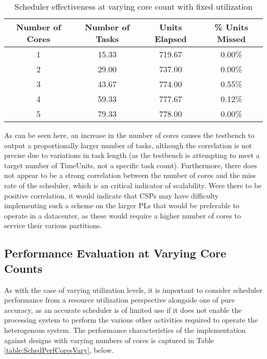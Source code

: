 \begin{table}[ht!]
    \centering\begin{tabular}{| c | c | c | c |}
        \hline
        Number of Cores & Number of Tasks & Units Elapsed & \% Units Missed \\
        \hline
        1 & 15.33 & 719.67 & 0.00\% \\
        2 & 29.00 & 737.00 & 0.00\% \\
        3 & 43.67 & 774.00 & 0.55\% \\
        4 & 59.33 & 777.67 & 0.12\% \\
        5 & 79.33 & 778.00 & 0.00\% \\
        \hline
    \end{tabular}
    \caption{Scheduler effectiveness at varying core count with fixed utilization}
    \label{table:SchedEffectivenessCoresVary}
\end{table}

As can be seen here, an increase in the number of cores causes the testbench to output a proportionally larger number of tasks, although the correlation is not precise due to variations in task length (as the testbench is attempting to meet a target number of TimeUnits, not a specific task count). Furthermore, there does not appear to be a strong correlation between the number of cores and the miss rate of the scheduler, which is an critical indicator of scalability. Were there to be positive correlation, it would indicate that CSPs may have difficulty implementing such a scheme on the larger PLs that would be preferable to operate in a datacenter, as these would require a higher number of cores to service their various partitions.

\subsection{Performance Evaluation at Varying Core Counts}\label{subsec:performanceDataCoresVary}
As with the case of varying utilization levels, it is important to consider scheduler performance from a resource utilization perspective alongside one of pure accuracy, as an accurate scheduler is of limited use if it does not enable the processing system to perform the various other activities required to operate the heterogenous system. The performance characteristics of the implementation against designs with varying numbers of cores is captured in Table \ref{table:SchedPerfCoresVary}, below.

